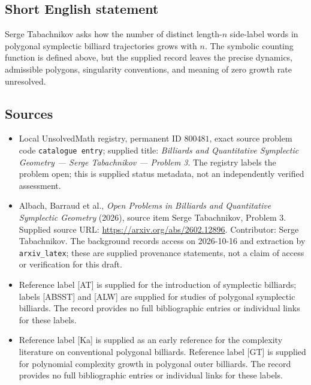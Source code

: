 \documentclass[11pt]{article}
\begin{document}
\subsection{Short English statement}
Serge Tabachnikov asks how the number of distinct length-\(n\) side-label words in polygonal symplectic billiard trajectories grows with \(n\). The symbolic counting function is defined above, but the supplied record leaves the precise dynamics, admissible polygons, singularity conventions, and meaning of zero growth rate unresolved.
\subsection{Sources}
\begin{itemize}
\item Local UnsolvedMath registry, permanent ID \(800481\), exact source problem code \texttt{catalogue entry}; supplied title: \emph{Billiards and Quantitative Symplectic Geometry --- Serge Tabachnikov --- Problem 3}. The registry labels the problem open; this is supplied status metadata, not an independently verified assessment.
\item Albach, Barraud et al., \emph{Open Problems in Billiards and Quantitative Symplectic Geometry} (2026), source item Serge Tabachnikov, Problem 3. Supplied source URL: \url{https://arxiv.org/abs/2602.12896}. Contributor: Serge Tabachnikov. The background records access on 2026-10-16 and extraction by \texttt{arxiv\_latex}; these are supplied provenance statements, not a claim of access or verification for this draft.
\item Reference label [AT] is supplied for the introduction of symplectic billiards; labels [ABSST] and [ALW] are supplied for studies of polygonal symplectic billiards. The record provides no full bibliographic entries or individual links for these labels.
\item Reference label [Ka] is supplied as an early reference for the complexity literature on conventional polygonal billiards. Reference label [GT] is supplied for polynomial complexity growth in polygonal outer billiards. The record provides no full bibliographic entries or individual links for these labels.
\end{itemize}
\end{document}
